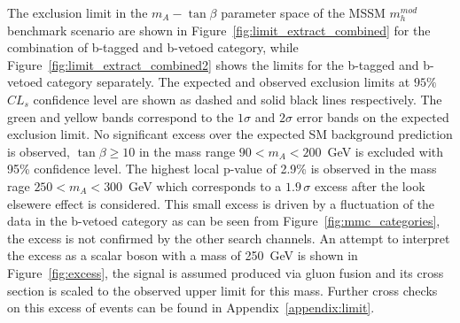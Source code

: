 The exclusion limit in the $m_A - \tan\beta$ parameter space  of the MSSM  $m_{h}^{mod}$ benchmark scenario
are  shown in Figure~\ref{fig:limit_extract_combined} for the combination of b-tagged and b-vetoed category, while Figure~\ref{fig:limit_extract_combined2}
shows the limits for the  b-tagged and b-vetoed category separately. 
The expected and observed exclusion limits at $95\%$ $CL_s$  confidence level 
are shown as dashed and solid black lines respectively. The green 
and yellow bands correspond to the $1\sigma$ and $2\sigma$ error bands on the expected exclusion limit. 
No significant excess over the expected SM background prediction is observed, $\tan\beta \geq 10$ in 
the mass range $90<m_A<200$~GeV is excluded with 95\% confidence level.  
The highest local p-value of 2.9\%  is observed in the mass rage $250< m_A <300$~GeV 
which  corresponds to a $1.9\,\sigma$ excess  after the look elsewere effect is considered. 
This small excess is driven by a fluctuation of the data in the b-vetoed category as can be seen from Figure~\ref{fig:mmc_categories},
the excess is not confirmed by the other search channels.
An attempt to interpret the excess as a scalar boson with a mass of 250~GeV is shown in Figure~\ref{fig:excess}, 
the signal is assumed produced via gluon fusion and its cross section is scaled to the observed upper limit for this mass.
Further cross checks on this excess of events can be found in Appendix~\ref{appendix:limit}.

